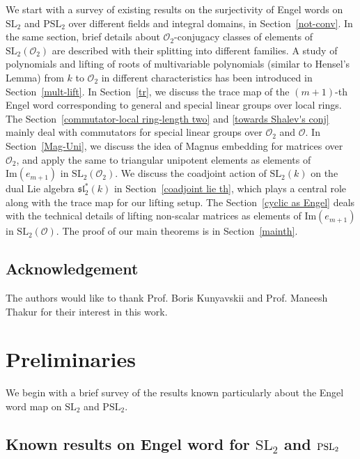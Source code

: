 \documentclass[10pt,twoside]{amsart}
\newcommand{\SL}{\mathrm{SL}}
\newcommand{\im}{\mathrm{Im}}
\newcommand{\R}{\mathcal{O}_2}
\theoremstyle{definition}
\theoremstyle{definition}
\begin{document}
We start with a survey of existing results on the surjectivity of Engel words on $\SL_2$ and $\text{PSL}_2$ over different fields and integral domains, in Section~\ref{not-conv}. In the same section, brief details about $\R$-conjugacy classes of elements of $\SL_2(\R)$ are described with their splitting into different families. A study of polynomials and lifting of roots of multivariable polynomials (similar to Hensel's Lemma) from $k$ to $\R$ in different characteristics has been introduced in Section~\ref{mult-lift}. In Section~\ref{tr}, we discuss the trace map of the $(m+1)$-th Engel word corresponding to general and special linear groups over local rings. The Section~\ref{commutator-local ring-length two} and \ref{towards Shalev's conj} mainly deal with commutators for special linear groups over $\mathcal{O}_2$ and $\mathcal{O}$.   In Section~\ref{Mag-Uni}, we discuss the idea of Magnus embedding for matrices over $\R$, and apply the same to triangular unipotent elements as elements of $\im(e_{m+1})$ in $\SL_2(\mathcal{O}_2)$. We discuss the coadjoint action of $\SL_2(k)$ on the dual Lie algebra $\mathfrak{sl}^*_2(k)$ in Section~\ref{coadjoint lie th}, which plays a central role along with the trace map for our lifting setup. The Section~\ref{cyclic as Engel} deals with the technical details of lifting non-scalar matrices as elements of $\im(e_{m+1})$ in $\SL_2(\mathcal{O})$. The proof of our main theorems is in Section~\ref{mainth}.  


\subsection{Acknowledgement}
The authors would like to thank Prof. Boris Kunyavskii and Prof. Maneesh Thakur for their interest in this work.


\section{Preliminaries}{\label{not-conv}}

We begin with a brief survey of the results known particularly about the Engel word map on $\SL_2$ and $\text{PSL}_2$. 

\subsection{Known results on Engel word for $\SL_2$ and $\rm{PSL}_2$}\label{known-results}
\end{document}
